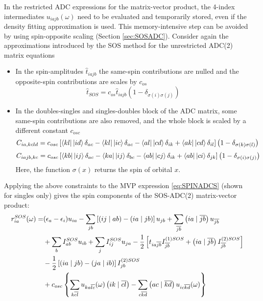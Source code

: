 In the restricted ADC expressions for the matrix-vector product, the 4-index intermediates $u_{iajb}(\omega)$ need to be evaluated and temporarily stored, even if the density fitting approximation is used. This memory-intensive step can be avoided by using spin-opposite scaling (Section \ref{sec:SOSADC}). Consider again the approximations introduced by the SOS method for the unrestricted ADC(2) matrix equations
\begin{itemize}
\item In the spin-amplitudes $\hat{t}_{iajb}$ the same-spin contributions are nulled and the opposite-spin contributions are scales by $c_{os}$
\begin{equation}
\hat{t}_{SOS} = c_{os} \hat{t}_{iajb} \left( 1 - \delta_{\sigma (i) \sigma (j)} \right)
\end{equation}
\item In the doubles-singles and singles-doubles block of the ADC matrix, some same-spin contributions are also removed, and the whole block is scaled by a different constant $c_{osc}$ 
\begin{equation}
C_{ia,kcld} = c_{osc} \left[ \bra{kl} {} \ket{id} \delta_{ac} - \bra{kl} {} \ket{ic} \delta_{ac} - \bra{al} {} \ket{cd} \delta_{ik} + \bra{ak} {} \ket{cd}\delta_{il} \right] \left( 1 - \delta_{\sigma (k) \sigma (l)} \right)
\end{equation}
\begin{equation}
C_{iajb,kc} = c_{osc} \left[ \bra{kb} {} \ket{ij} \delta_{ac} - \bra{ka} {} \ket{ij} \delta_{bc} - \bra{ab} {} \ket{cj} \delta_{ik} + \bra{ab} {} \ket{ci}\delta_{jk} \right] \left( 1 - \delta_{\sigma (i) \sigma (j)} \right)
\end{equation}
\noindent Here, the function $\sigma(x)$ returns the spin of orbital $x$.
\end{itemize}
Applying the above constraints to the MVP expression \ref{eq:SPINADCS} (shown for singles only) gives the spin components of the SOS-ADC(2) matrix-vector product:
\begin{equation}
\begin{split}
r_{ia}^{SOS}( \omega) = &(\epsilon_a - \epsilon_i) u_{ia} - \sum_{jb} \left[ \left( ij \mid ab \right) - \left( ia \mid jb \right) \right] u_{jb} + \sum_{\overline{jb}} \left( ia \mid \overline{jb} \right) u_{\overline{jb}} \\
&+ \sum_b I^{SOS}_{ab} u_{ib} + \sum_{j} I^{SOS}_{ij} u_{ja} - \frac{1}{2} \left[ t_{ia\overline{jb}} I^{(1)SOS}_{\overline{jb}} + \left( ia \mid \overline{jb} \right) I_{\overline{jb}}^{(2)SOS} \right] \\
&- \frac{1}{2} \left[\left( ia \mid jb \right) - \left( ja \mid ib \right) \right] I_{jb}^{(2)SOS} \\
&+ c_{osc} \left\lbrace \sum_{k\overline{cl}} u_{ka\overline{lc}}(\omega) \left( ik \mid \overline{cl} \right) - \sum_{c\overline{kd}} \left( ac \mid \overline{kd} \right) u_{ic\overline{kd}}(\omega) \right\rbrace
\end{split}
\label{SPINSOSADC2S}
\end{equation}  
